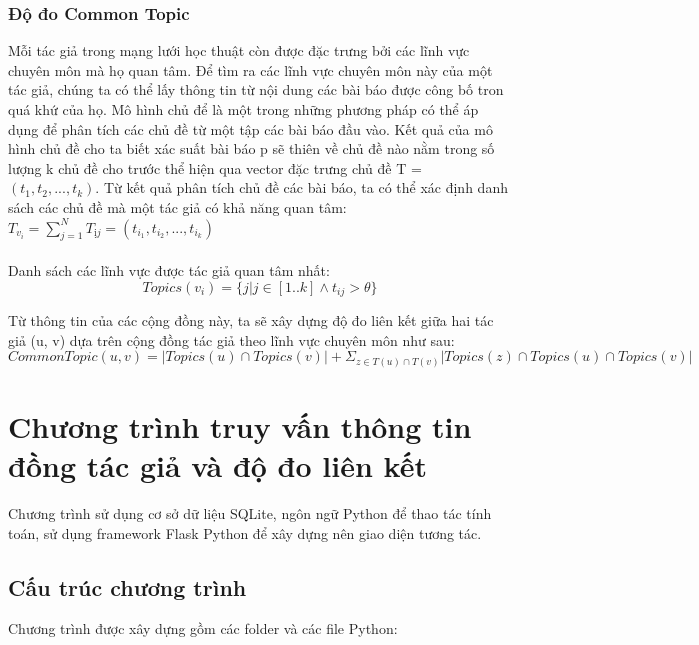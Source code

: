 \documentclass{article}
\begin{document}
\subsubsection{Độ đo Common Topic}

Mỗi tác giả trong mạng lưới học thuật còn được đặc trưng bởi các lĩnh vực chuyên môn mà họ quan tâm. Để tìm ra các lĩnh vực chuyên môn này của một tác giả, chúng ta có thể lấy thông tin từ nội dung các bài báo được công bố tron quá khứ của họ. Mô hình chủ để là một trong những phương pháp có thể áp dụng để phân tích các chủ đề từ một tập các bài báo đầu vào. Kết quả của mô hình chủ đề cho ta biết xác suất bài báo p sẽ thiên về chủ đề nào nằm trong số lượng k chủ đề cho trước thể hiện qua vector đặc trưng chủ đề T = $(t_1, t_2, ..., t_k)$. Từ kết quả phân tích chủ đề các bài báo, ta có thể xác định danh sách các chủ đề mà một tác giả có khả năng quan tâm: 
$T_{v_i} = \sum_{j=1}^N T_{ịj} = (t_{i_1}, t_{i_2}, ..., t_{i_k})$ \\\\

Danh sách các lĩnh vực được tác giả quan tâm nhất:
\[
Topics(v_i) = \{j | j \in [1..k] \land t_{ij} > \theta \}
\]

Từ thông tin của các cộng đồng này, ta sẽ xây dựng độ đo liên kết giữa hai tác giả (u, v) dựa trên cộng đồng tác giả theo lĩnh vực chuyên môn như sau:
\[
CommonTopic(u, v) = |Topics(u) \cap Topics(v)| + \Sigma_{z \in T(u) \cap T(v)} |Topics(z) \cap Topics(u) \cap Topics(v)|
\]

\newpage

\section{Chương trình truy vấn thông tin đồng tác giả và độ đo liên kết}

Chương trình sử dụng cơ sở dữ liệu SQLite, ngôn ngữ Python để thao tác tính toán, sử dụng framework Flask Python để xây dựng nên giao diện tương tác.

\subsection{Cấu trúc chương trình}

Chương trình được xây dựng gồm các folder và các file Python:
\end{document}
